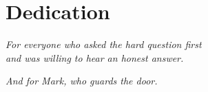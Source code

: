 \chapter*{Dedication}

\begin{center}
\vspace*{2cm}

\textit{For everyone who asked the hard question first\\
and was willing to hear an honest answer.}

\vspace{1.5cm}

\textit{And for Mark, who guards the door.}

\end{center}

\newpage
